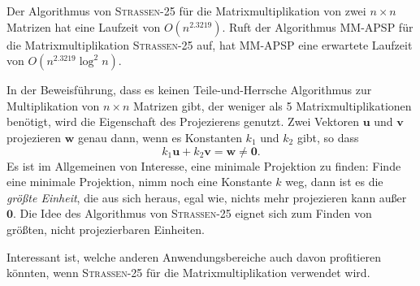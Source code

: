 \documentclass{scrartcl}
\numberwithin{equation}{section}
\begin{document}
Der Algorithmus von \textsc{Strassen-25} für die Matrixmultiplikation von zwei $n \times n$ Matrizen hat eine Laufzeit von $O(n^{2.3219})$. Ruft der Algorithmus MM-APSP für die Matrixmultiplikation \textsc{Strassen-25} auf, hat MM-APSP eine erwartete Laufzeit von $O(n^{2.3219} \log^2 n)$. 

In der Beweisführung, dass es keinen Teile-und-Herrsche Algorithmus zur Multiplikation von $n \times n$ Matrizen gibt, der weniger als 5 Matrixmultiplikationen benötigt, wird die Eigenschaft des Projezierens genutzt. Zwei Vektoren $\boldsymbol{u}$ und $\boldsymbol{v}$ projezieren $\boldsymbol{w}$ genau dann, wenn es Konstanten $k_1$ und $k_2$ gibt, so dass $$k_1 \boldsymbol{u} + k_2\boldsymbol{v} = \boldsymbol{w} \neq \boldsymbol{0}.$$ Es ist im Allgemeinen von Interesse, eine minimale Projektion zu finden: Finde eine minimale Projektion, nimm noch eine Konstante $k$ weg, dann ist es die \textit{größte Einheit}, die aus sich heraus, egal wie, nichts mehr projezieren kann außer $\boldsymbol{0}$. Die Idee des Algorithmus von \textsc{Strassen-25} eignet sich zum Finden von größten, nicht projezierbaren Einheiten.

Interessant ist, welche anderen Anwendungsbereiche auch davon profitieren könnten, wenn \textsc{Strassen-25} für die Matrixmultiplikation verwendet wird.
\end{document}
